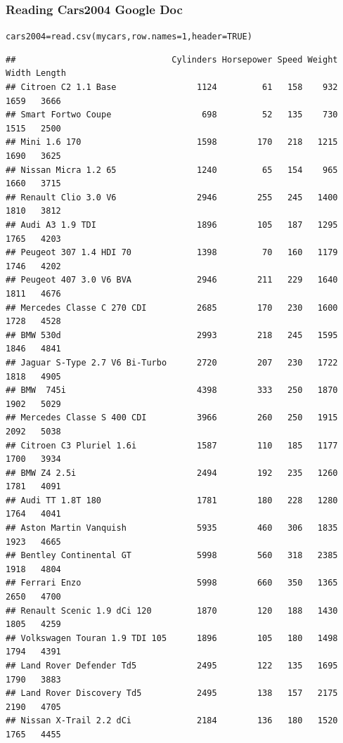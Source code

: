 \documentclass{beamer}\usepackage[]{graphicx}\usepackage[]{color}
\makeatletter
\newcommand{\hlnum}[1]{\textcolor[rgb]{0.063,0.58,0.627}{#1}}%
\newcommand{\hlstd}[1]{\textcolor[rgb]{0.196,0.196,0.196}{#1}}%
\newcommand{\hlkwb}[1]{\textcolor[rgb]{0.627,0,0.314}{#1}}%
\newcommand{\hlkwc}[1]{\textcolor[rgb]{0,0.631,0.314}{#1}}%
\newcommand{\hlkwd}[1]{\textcolor[rgb]{0.78,0.227,0.412}{#1}}%
\newenvironment{kframe}{%
 \def\at@end@of@kframe{}%
 \ifinner\ifhmode%
  \def\at@end@of@kframe{\end{minipage}}%
  \begin{minipage}{\columnwidth}%
 \fi\fi%
 \def\FrameCommand##1{\hskip\@totalleftmargin \hskip-\fboxsep
 \colorbox{shadecolor}{##1}\hskip-\fboxsep
     \hskip-\linewidth \hskip-\@totalleftmargin \hskip\columnwidth}%
 \MakeFramed {\advance\hsize-\width
   \@totalleftmargin\z@ \linewidth\hsize
   \@setminipage}}%
 {\par\unskip\endMakeFramed%
 \at@end@of@kframe}
\newenvironment{knitrout}{}{} %
\makeatother
\begin{document}
\begin{frame}[fragile]
\frametitle{Reading Cars2004 Google Doc}

\begin{knitrout}\tiny
{}\color{fgcolor}\begin{kframe}
\begin{alltt}
\hlstd{cars2004} \hlkwb{=} \hlkwd{read.csv}\hlstd{(mycars,} \hlkwc{row.names}\hlstd{=}\hlnum{1}\hlstd{,} \hlkwc{header}\hlstd{=}\hlnum{TRUE}\hlstd{)}
\end{alltt}
\begin{verbatim}
##                               Cylinders Horsepower Speed Weight Width Length
## Citroen C2 1.1 Base                1124         61   158    932  1659   3666
## Smart Fortwo Coupe                  698         52   135    730  1515   2500
## Mini 1.6 170                       1598        170   218   1215  1690   3625
## Nissan Micra 1.2 65                1240         65   154    965  1660   3715
## Renault Clio 3.0 V6                2946        255   245   1400  1810   3812
## Audi A3 1.9 TDI                    1896        105   187   1295  1765   4203
## Peugeot 307 1.4 HDI 70             1398         70   160   1179  1746   4202
## Peugeot 407 3.0 V6 BVA             2946        211   229   1640  1811   4676
## Mercedes Classe C 270 CDI          2685        170   230   1600  1728   4528
## BMW 530d                           2993        218   245   1595  1846   4841
## Jaguar S-Type 2.7 V6 Bi-Turbo      2720        207   230   1722  1818   4905
## BMW  745i                          4398        333   250   1870  1902   5029
## Mercedes Classe S 400 CDI          3966        260   250   1915  2092   5038
## Citroen C3 Pluriel 1.6i            1587        110   185   1177  1700   3934
## BMW Z4 2.5i                        2494        192   235   1260  1781   4091
## Audi TT 1.8T 180                   1781        180   228   1280  1764   4041
## Aston Martin Vanquish              5935        460   306   1835  1923   4665
## Bentley Continental GT             5998        560   318   2385  1918   4804
## Ferrari Enzo                       5998        660   350   1365  2650   4700
## Renault Scenic 1.9 dCi 120         1870        120   188   1430  1805   4259
## Volkswagen Touran 1.9 TDI 105      1896        105   180   1498  1794   4391
## Land Rover Defender Td5            2495        122   135   1695  1790   3883
## Land Rover Discovery Td5           2495        138   157   2175  2190   4705
## Nissan X-Trail 2.2 dCi             2184        136   180   1520  1765   4455
\end{verbatim}
\end{kframe}
\end{knitrout}

\end{frame}
\end{document}
